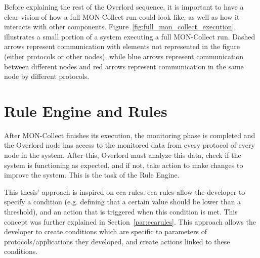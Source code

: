 Before explaining the rest of the Overlord sequence, it is important to have a clear vision of how a full MON-Collect run could look like, as well as how it interacts with other components. Figure~\ref{fig:full_mon_collect_execution}, illustrates a small portion of a system executing a full MON-Collect run. Dashed arrows represent communication with elements not represented in the figure (either protocols or other nodes), while blue arrows represent communication between different nodes and red arrows represent communication in the same node by different protocols.



\section{Rule Engine and Rules}
\label{sec:ruleengine}
After MON-Collect finishes its execution, the monitoring phase is completed and the Overlord node has access to the monitored data from every protocol of every node in the system. After this, Overlord must analyze this data, check if the system is functioning as expected, and if not, take action to make changes to improve the system. This is the task of the Rule Engine.

This thesis' approach is inspired on \gls{eca} rules. \gls{eca} rules allow the developer to specify a condition (e.g. defining that a certain value should be lower than a threshold), and an action that is triggered when this condition is met. This concept was further explained in Section~\ref{par:ecarules}. This approach allows the developer to create conditions which are specific to parameters of protocols/applications they developed, and create actions linked to these conditions.

